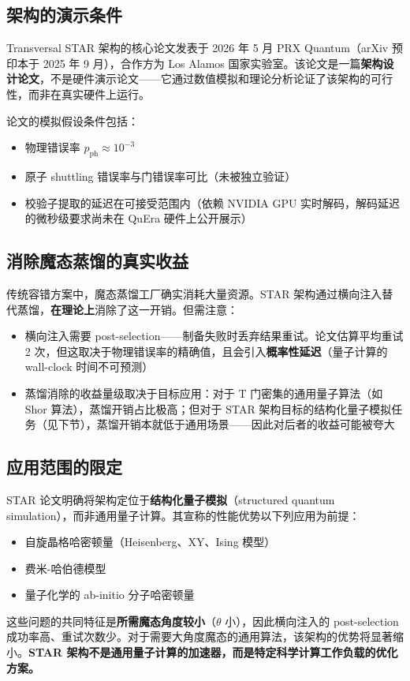\documentclass[11pt,a4paper]{ctexart}
\begin{document}
\subsection{架构的演示条件}

Transversal STAR 架构的核心论文发表于 2026 年 5 月 PRX Quantum（arXiv 预印本于 2025 年 9 月），合作方为 Los Alamos 国家实验室。该论文是一篇\textbf{架构设计论文}，不是硬件演示论文——它通过数值模拟和理论分析论证了该架构的可行性，而非在真实硬件上运行。

论文的模拟假设条件包括：
\begin{itemize}
\item 物理错误率 $p_{\mathrm{ph}} \approx 10^{-3}$
\item 原子 shuttling 错误率与门错误率可比（未被独立验证）
\item 校验子提取的延迟在可接受范围内（依赖 NVIDIA GPU 实时解码，解码延迟的微秒级要求尚未在 QuEra 硬件上公开展示）
\end{itemize}

\subsection{消除魔态蒸馏的真实收益}

传统容错方案中，魔态蒸馏工厂确实消耗大量资源。STAR 架构通过横向注入替代蒸馏，\textbf{在理论上}消除了这一开销。但需注意：

\begin{itemize}
\item 横向注入需要 post-selection——制备失败时丢弃结果重试。论文估算平均重试 2 次，但这取决于物理错误率的精确值，且会引入\textbf{概率性延迟}（量子计算的 wall-clock 时间不可预测）
\item 蒸馏消除的收益量级取决于目标应用：对于 T 门密集的通用量子算法（如 Shor 算法），蒸馏开销占比极高；但对于 STAR 架构目标的结构化量子模拟任务（见下节），蒸馏开销本就低于通用场景——因此对后者的收益可能被夸大
\end{itemize}

\subsection{应用范围的限定}

STAR 论文明确将架构定位于\textbf{结构化量子模拟}（structured quantum simulation），而非通用量子计算。其宣称的性能优势以下列应用为前提：
\begin{itemize}
\item 自旋晶格哈密顿量（Heisenberg、XY、Ising 模型）
\item 费米-哈伯德模型
\item 量子化学的 ab-initio 分子哈密顿量
\end{itemize}
这些问题的共同特征是\textbf{所需魔态角度较小}（$\theta$ 小），因此横向注入的 post-selection 成功率高、重试次数少。对于需要大角度魔态的通用算法，该架构的优势将显著缩小。\textbf{STAR 架构不是通用量子计算的加速器，而是特定科学计算工作负载的优化方案。}
\end{document}
